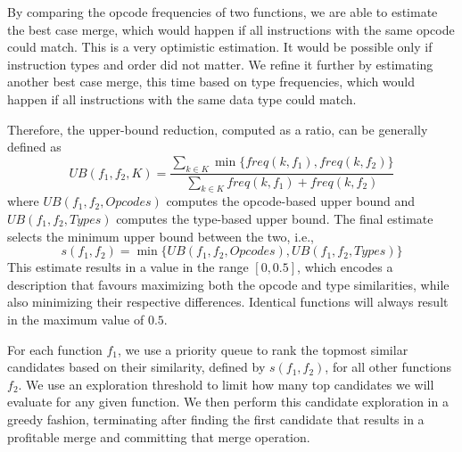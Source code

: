 By comparing the opcode frequencies of two functions, we are able to estimate
the best case merge, which would happen if all instructions with the same opcode could match.
This is a very optimistic estimation. It would be possible only if instruction types and order
did not matter. We refine it further by estimating another best case merge, this time based
on type frequencies, which would happen if all instructions with the same data type could match.


Therefore, the upper-bound reduction, computed as a ratio, can be generally defined as
\[
   U\!B(f_1,f_2, K) = \frac{\sum\limits_{k \in K} \min\{freq(k,f_1),freq(k,f_2)\}}{\sum\limits_{k \in K} freq(k,f_1)+freq(k,f_2)}
\]
where $U\!B(f_1,f_2, Opcodes)$ computes the opcode-based upper bound and
$U\!B(f_1,f_2, Types)$ computes the type-based upper bound.
The final estimate selects the minimum upper bound between the two, i.e.,
\[
     s(f_1,f_2) = \min\{U\!B(f_1,f_2, Opcodes), U\!B(f_1,f_2, Types)\}
\]
This estimate results in a value in the range $[0,0.5]$,
which encodes a description that favours maximizing both the opcode and type
similarities, while also minimizing their respective differences.
Identical functions will always result in the maximum value of $0.5$.

For each function $f_1$, we use a priority queue to rank the topmost
similar candidates based on their similarity, defined by $s(f_1,f_2)$, for all
other functions $f_2$.
We use an exploration threshold to limit how many top candidates we will
evaluate for any given function.
We then perform this candidate exploration in a greedy fashion, terminating after
finding the first candidate that results in a profitable merge and committing that
merge operation.

